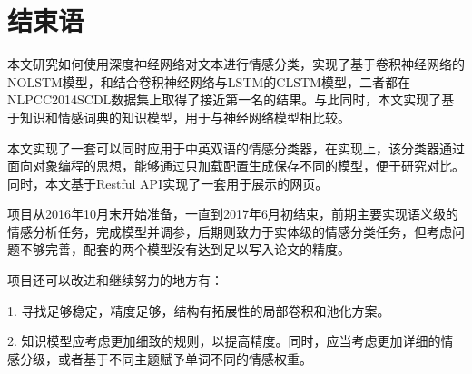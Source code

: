 \chapter{结束语}\thispagestyle{fancy}
本文研究如何使用深度神经网络对文本进行情感分类，实现了基于卷积神经网络的NOLSTM模型，和结合卷积神经网络与LSTM的CLSTM模型，二者都在NLPCC2014SCDL数据集上取得了接近第一名的结果。与此同时，本文实现了基于知识和情感词典的知识模型，用于与神经网络模型相比较。\par
本文实现了一套可以同时应用于中英双语的情感分类器，在实现上，该分类器通过面向对象编程的思想，能够通过只加载配置生成保存不同的模型，便于研究对比。同时，本文基于Restful API实现了一套用于展示的网页。\par
项目从2016年10月末开始准备，一直到2017年6月初结束，前期主要实现语义级的情感分析任务，完成模型并调参，后期则致力于实体级的情感分类任务，但考虑问题不够完善，配套的两个模型没有达到足以写入论文的精度。\par
项目还可以改进和继续努力的地方有：\par
1. 寻找足够稳定，精度足够，结构有拓展性的局部卷积和池化方案。\par
2. 知识模型应考虑更加细致的规则，以提高精度。同时，应当考虑更加详细的情感分级，或者基于不同主题赋予单词不同的情感权重。